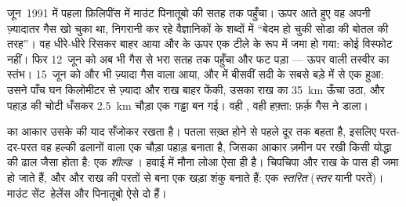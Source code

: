 \begin{example}[पिनातूबो, 1991: बेदम सोडा और हिलाया हुआ सोडा]\label{ex:g7:volcanoes:pinatubo}
जून~1991 में पहला  फ़िलिपींस में माउंट पिनातूबो की सतह तक पहुँचा। ऊपर
आते हुए वह अपनी ज़्यादातर गैस खो चुका था, निगरानी कर रहे वैज्ञानिकों के शब्दों
में ``बेदम हो चुकी सोडा की बोतल की तरह''। वह धीरे-धीरे रिसकर बाहर आया और
 के ऊपर एक टीले के रूप में जमा हो गया: कोई विस्फोट नहीं। फिर
12~जून को अब भी गैस से भरा  सतह तक पहुँचा और फट पड़ा --- ऊपर वाली
तस्वीर का स्तंभ। 15~जून को और भी ज़्यादा गैस वाला  आया, और  में
बीसवीं सदी के सबसे बड़े  में से एक हुआ: उसने पाँच घन किलोमीटर से ज़्यादा
 और राख बाहर फेंकी, उसका राख का  \qty{35}{km} ऊँचा उठा, और पहाड़ की
चोटी धँसकर \qty{2.5}{km} चौड़ा एक गड्ढा बन गई। वही , वही हफ़्ता: फ़र्क़
गैस ने डाला।
\end{example}

 का आकार उसके  की याद सँजोकर रखता है। पतला  सख़्त होने से
पहले दूर तक बहता है, इसलिए परत-दर-परत वह हल्की ढलानों वाला एक चौड़ा पहाड़
बनाता है, जिसका आकार ज़मीन पर रखी किसी योद्धा की ढाल जैसा होता है: एक
\emph{शील्ड }। हवाई में मौना लोआ ऐसा ही है। चिपचिपा  और राख
 के पास ही जमा हो जाते हैं, और  और राख की परतों से बना एक खड़ा
शंकु बनाते हैं: एक \emph{स्तरित } (\emph{स्तर} यानी परतें)। माउंट
सेंट~हेलेंस और पिनातूबो ऐसे दो  हैं।

